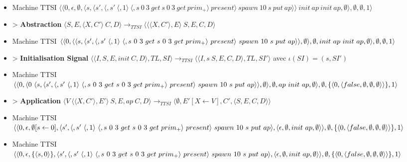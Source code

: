 \documentclass[10pt,a4paper]{report}
\begin{document}
 			\begin{itemize}
 				\item[] Machine TTSI $\langle\langle 0,\epsilon,\emptyset,\langle s,\langle s', \langle, s'~\langle,1\rangle~\langle,s~0~3~get~s~0~3~get~prim_{+}\rangle~present\rangle~spawn~10~s~put~ap\rangle\rangle~init~ap~init~ap,\emptyset\rangle,\emptyset,\emptyset,1\rangle$
 				\item[] > \textbf{Abstraction} $\langle S,E,\langle X,C'\rangle~C,D\rangle
 				\longrightarrow_{TTSI} 
 				\langle \langle\langle X,C'\rangle,E\rangle~S,E,C,D\rangle$
 				\item[] Machine TTSI $\langle\langle 0,\langle\langle s,\langle s', \langle, s'~\langle,1\rangle~\langle,s~0~3~get~s~0~3~get~prim_{+}\rangle~present\rangle~spawn~10~s~put~ap\rangle\rangle,\emptyset \rangle,\emptyset,init~ap~init~ap,\emptyset\rangle,\\\emptyset,\emptyset,1\rangle$
 				\item[] > \textbf{Initialisation Signal} $\langle\langle I,S,E,init~C,D\rangle,TL,SI\rangle 
 				\longrightarrow_{TTSI}
 				\langle\langle I,s~S,E,C,D\rangle,TL,SI'\rangle$
 				avec $\iota(SI) = (s,SI')$
 				\item[] Machine TTSI $\langle\langle 0,\langle 0~\langle s,\langle s', \langle, s'~\langle,1\rangle~\langle,s~0~3~get~s~0~3~get~prim_{+}\rangle~present\rangle~spawn~10~s~put~ap\rangle\rangle,\emptyset \rangle,\emptyset,ap~init~ap,\emptyset\rangle,\\\emptyset,\{\langle 0,\langle false,\emptyset,\emptyset,\emptyset\rangle\rangle\},1\rangle$
 				\item[] > \textbf{Application} $\langle V~\langle\langle X,C'\rangle,E'\rangle~S,E,ap~C,D\rangle
 				\longrightarrow_{TTSI} 
 				\langle \emptyset,E'[X \leftarrow V],C',\langle S,E,C,D\rangle\rangle$
 				\item[] Machine TTSI $\langle\langle 0,\epsilon,\emptyset[s \leftarrow 0],\langle s', \langle, s'~\langle,1\rangle~\langle,s~0~3~get~s~0~3~get~prim_{+}\rangle~present\rangle~spawn~10~s~put~ap\rangle,\langle\epsilon,\emptyset,init~ap,\emptyset\rangle\rangle,\\\emptyset,\{\langle 0,\langle false,\emptyset,\emptyset,\emptyset\rangle\rangle\},1\rangle$
 				\item[] Machine TTSI $\langle\langle 0,\epsilon,\{\langle s,0\rangle\},\langle s', \langle, s'~\langle,1\rangle~\langle,s~0~3~get~s~0~3~get~prim_{+}\rangle~present\rangle~spawn~10~s~put~ap\rangle,\langle\epsilon,\emptyset,init~ap,\emptyset\rangle\rangle,\\\emptyset,\{\langle 0,\langle false,\emptyset,\emptyset,\emptyset\rangle\rangle\},1\rangle$

\end{itemize}
\end{document}
